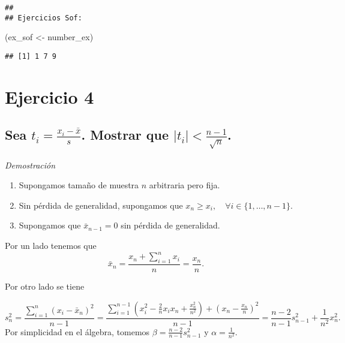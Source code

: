 \documentclass[]{article}
\newenvironment{Shaded}{\begin{snugshade}}{\end{snugshade}}
\newcommand{\NormalTok}[1]{#1}
\newcommand{\StringTok}[1]{\textcolor[rgb]{0.31,0.60,0.02}{#1}}
\providecommand{\tightlist}{%
  \setlength{\itemsep}{0pt}\setlength{\parskip}{0pt}}
\begin{document}
\begin{verbatim}
## 
## Ejercicios Sof:
\end{verbatim}

\begin{Shaded}
\begin{Highlighting}[]
\NormalTok{(ex_sof <-}\StringTok{ }\NormalTok{number_ex)}
\end{Highlighting}
\end{Shaded}

\begin{verbatim}
## [1] 1 7 9
\end{verbatim}

\hypertarget{ejercicio-4}{%
\section{Ejercicio 4}\label{ejercicio-4}}

\hypertarget{sea-t_i-fracx_i-barxs.-mostrar-que-t_i-fracn-1sqrtn.}{%
\subsection{\texorpdfstring{Sea \(t_{i} = \frac{x_{i}-\bar{x}}{s}\).
Mostrar que
\(|t_{i}| < \frac{n-1}{\sqrt{n}}\).}{Sea t\_\{i\} = \textbackslash frac\{x\_\{i\}-\textbackslash bar\{x\}\}\{s\}. Mostrar que \textbar t\_\{i\}\textbar{} \textless{} \textbackslash frac\{n-1\}\{\textbackslash sqrt\{n\}\}.}}\label{sea-t_i-fracx_i-barxs.-mostrar-que-t_i-fracn-1sqrtn.}}

\emph{Demostración}

\begin{enumerate}
\def\labelenumi{\arabic{enumi}.}
\tightlist
\item
  Supongamos tamaño de muestra \(n\) arbitraria pero fija.
\item
  Sin pérdida de generalidad, supongamos que
  \(x_{n} \geq x_{i}, \quad \forall i \in \{1,\dots,n-1\}\).
\item
  Supongamos que \(\bar{x}_{n-1} = 0\) sin pérdida de generalidad.
\end{enumerate}

Por un lado tenemos que
\[ \bar{x}_{n} = \frac{x_{n} + \sum_{i = 1}^{n}{x_{i}}}{n} = \frac{x_{n}}{n}.\]

Por otro lado se tiene

\[s_{n}^{2} = \frac{\sum_{i=1}^{n}{(x_{i} - \bar{x}_{n})^{2}}}{n-1} = \frac{\sum_{i=1}^{n-1}{(x_{i}^{2} - \frac{2}{n}x_{i}x_{n} + \frac{x_{n}^{2}}{n^{2}})} + (x_{n} - \frac{x_{n}}{n})^{2}}{n-1} = \frac{n-2}{n-1}s^{2}_{n-1} + \frac{1}{n^{2}}x_{n}^{2}.\]
Por simplicidad en el álgebra, tomemos
\(\beta = \frac{n-2}{n-1}s^{2}_{n-1}\) y \(\alpha = \frac{1}{n^{2}}.\)
\end{document}
